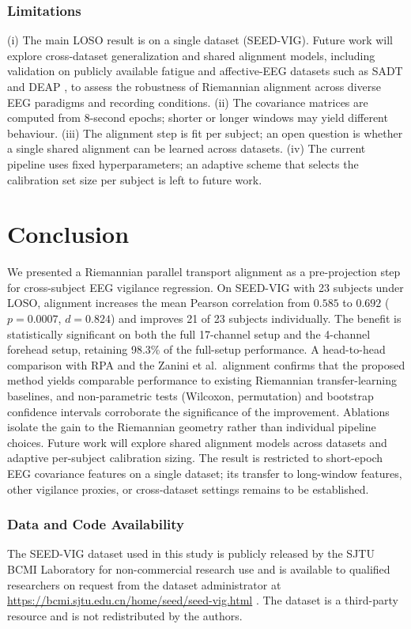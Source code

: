 \documentclass[journal,twoside,web]{ieeecolor2}
\begin{document}
\subsubsection{Limitations} (i) The main LOSO result is on a single dataset (SEED-VIG). Future work
will explore cross-dataset generalization and shared alignment models,
including validation on publicly available fatigue and
affective-EEG datasets such as SADT \cite{zhao2021lammsda} and
DEAP \cite{koelstra2012deap}, to assess the robustness of Riemannian
alignment across diverse EEG paradigms and recording conditions.
(ii) The covariance matrices are computed from 8-second epochs;
shorter or longer windows may yield different behaviour. (iii) The
alignment step is fit per subject; an open question is whether a
single shared alignment can be learned across datasets. (iv) The
current pipeline uses fixed hyperparameters; an adaptive scheme that
selects the calibration set size per subject is left to future work.

\section{Conclusion}
\label{sec:conclusion}

We presented a Riemannian parallel transport alignment as a
pre-projection step for cross-subject EEG vigilance regression. On
SEED-VIG with 23 subjects under LOSO, alignment increases the mean
Pearson correlation from $0.585$ to $0.692$ ($p = 0.0007$, $d =
0.824$) and improves 21 of 23 subjects individually. The benefit
is statistically significant on both the full 17-channel setup and
the 4-channel forehead setup, retaining 98.3\% of the
full-setup performance. A head-to-head comparison with RPA and the
Zanini et al.\ alignment confirms that the proposed method yields
comparable performance to existing Riemannian transfer-learning
baselines, and
non-parametric tests (Wilcoxon, permutation) and bootstrap confidence
intervals corroborate the significance of the improvement. Ablations
isolate the gain to the Riemannian geometry rather than individual
pipeline choices. Future work will explore shared alignment models
across datasets and adaptive per-subject calibration sizing. The
result is restricted to short-epoch EEG covariance features on a
single dataset; its transfer to long-window features, other vigilance
proxies, or cross-dataset settings remains to be established.

\subsubsection{Data and Code Availability}
The SEED-VIG dataset used in this study is publicly released by the
SJTU BCMI Laboratory for non-commercial research use and is
available to qualified researchers on request from the dataset
administrator at \protect\url{https://bcmi.sjtu.edu.cn/home/seed/seed-vig.html}
\cite{zheng2017}. The dataset is a third-party resource and is not
redistributed by the authors.
\end{document}

